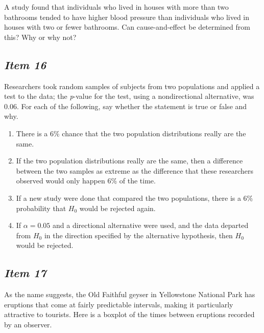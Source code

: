 A study found that individuals who lived in houses with more than two bathrooms tended to have higher blood pressure than individuals who lived in houses with two or fewer bathrooms. Can cause-and-effect be determined from this? Why or why not?





\subsection{\textbf{\textit{Item 16}}}


Researchers took random samples of subjects from two populations and applied a test to the data; the \textit{p}-value for the test, using a nondirectional alternative, was 0.06. For each of the following, say whether the statement is true or false and why.


\begin{enumerate}[leftmargin=1cm, itemsep=.2em]


\item There is a 6\% chance that the two population distributions really are the same.


\item If the two population distributions really are the same, then a difference between the two samples as extreme as the difference that these researchers observed would only happen 6\% of the time.


\item If a new study were done that compared the two populations, there is a 6\% probability that $H_0$ would be rejected again.


\item If $\alpha = 0.05$ and a directional alternative were used, and the data departed from $H_0$ in the direction specified by the alternative hypothesis, then $H_0$ would be rejected.


\end{enumerate}





\subsection{\textbf{\textit{Item 17}}}





As the name suggests, the Old Faithful geyser in Yellowstone National
Park has eruptions that come at fairly predictable intervals, making
it particularly attractive to tourists. Here is a boxplot of the times
between eruptions recorded by an observer.





